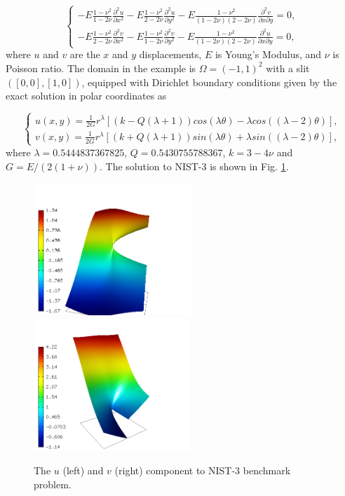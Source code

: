 \documentclass[12pt]{elsarticle}
\begin{document}
\begin{equation}\label{crack}
\left\{
\begin{array}{l}
\displaystyle
-E \frac{1-\nu^2}{1-2\nu} \frac{\partial^{2} u}{\partial x^{2}} - E\frac{1-\nu^2}{2-2 \nu} \frac{\partial^{2} u}{\partial y^{2}}
-E \frac{1-\nu^2}{(1-2\nu)(2-2\nu)} \frac{\partial^{2} v}{\partial x \partial y} = 0, \\[3mm]
\displaystyle
-E \frac{1-\nu^2}{2-2\nu} \frac{\partial^{2} v}{\partial x^{2}} - E\frac{1-\nu^2}{1-2\nu} \frac{\partial^{2} v}{\partial y^{2}}
-E \frac{1-\nu^2}{(1-2\nu)(2-2\nu)} \frac{\partial^{2} u}{\partial x \partial y} = 0,
\end{array}
\right.
\end{equation}
where $u$ and $v$ are the
$x$ and $y$ displacements, $E$ is Young's Modulus,
and $\nu$ is Poisson ratio.
The domain in the example is $\Omega = (-1, 1)^2$ with a slit $([0,0], [1,0])$,
equipped with Dirichlet boundary conditions given by the
exact solution in polar coordinates as

\[
\left\{
\begin{array}{l}
\displaystyle
u(x, y) = \frac{1}{2G} r^{\lambda}[(k - Q(\lambda + 1))cos(\lambda \theta) - \lambda cos((\lambda - 2) \theta)],  \\[3mm]
\displaystyle
v(x, y) = \frac{1}{2G} r^{\lambda}[(k + Q(\lambda + 1))sin(\lambda \theta) + \lambda sin((\lambda - 2) \theta)],
\end{array}
\right.
\]
where $\lambda = 0.5444837367825$, $Q = 0.5430755788367$,
$k = 3 - 4 \nu$ and $G = E / (2(1 + \nu))$.
The solution to NIST-3 is shown in Fig. \ref{fig:sln-nist03}.

\begin{figure}[H]
\centering
\includegraphics[height=5cm]{nist/nist-3/solution-u.png}\ \
\includegraphics[height=5cm]{nist/nist-3/solution-v.png}
\caption{The $u$ (left) and $v$ (right) component to NIST-3 benchmark problem.}
\label{fig:sln-nist03}
\end{figure}
\end{document}
